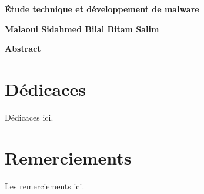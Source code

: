 
\thispagestyle{plain}
\begin{center}
    \Large
    \textbf{Étude technique et développement de malware}
    
    \vspace{0.4cm}
    \large
    
    \vspace{0.4cm}
    \textbf{Malaoui Sidahmed Bilal \hspace{3cm} Bitam Salim}
    
    \vspace{0.9cm}
    \textbf{Abstract}
\end{center}

\chapter*{Dédicaces}
Dédicaces ici.

\chapter*{Remerciements}
Les remerciements ici.